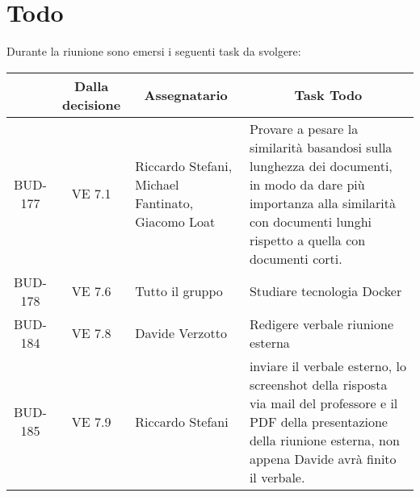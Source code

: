 

\section{Todo}

Durante la riunione sono emersi i seguenti task da svolgere:

\vspace{0.5cm}

\begin{table}[htbp]
\centering
{}
\begin{tabular}{|c|c|p{}|p{}|}
    \hline
    \rowcolor[gray]{0.75}
    \multicolumn{1}{|c|}{\textbf{Codice}} & \multicolumn{1}{|c|}{\textbf{Dalla decisione}} & \multicolumn{1}{|c|}{\textbf{Assegnatario}} & \multicolumn{1}{|c|}{\textbf{Task Todo}} \\
    \hline
    BUD-177 & VE 7.1 & Riccardo Stefani, Michael Fantinato, Giacomo Loat & Provare a pesare la similarità basandosi sulla lunghezza dei documenti, in modo da dare più importanza alla similarità con documenti lunghi rispetto a quella con documenti corti. \\
    BUD-178 & VE 7.6 & Tutto il gruppo & Studiare tecnologia Docker \\
    BUD-184 & VE 7.8 & Davide Verzotto & Redigere verbale riunione esterna \\
    BUD-185 & VE 7.9 & Riccardo Stefani & inviare il verbale esterno, lo screenshot della risposta via mail del professore e il PDF della presentazione della riunione esterna, non appena Davide avrà finito il verbale. \\
    \hline
\end{tabular}
\end{table}
